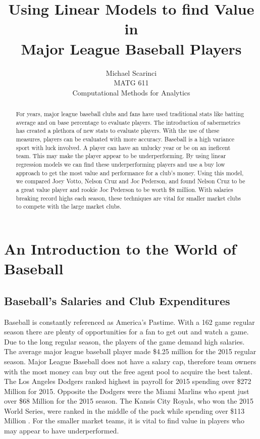 \documentclass[12pt]{article}
\title{Using Linear Models to find Value in \\Major League Baseball Players}
\author{Michael Scarinci \\MATG 611 \\Computational Methods for Analytics}
\begin{document}
\maketitle

\begin{abstract}
For years, major league baseball clubs and fans have used traditional stats like batting average and on base percentage to evaluate players. The introduction of sabermetrics has created a plethora of new stats to evaluate players. With the use of these measures, players can be evaluated with more accuracy. Baseball is a high variance sport with luck involved. A player can have an unlucky year or be on an ineficent team. This may make the player appear to be underperforming. By using linear regression models we can find these underperforming players and use a buy low approach to get the most value and performance for a club's money. Using this model, we compared Joey Votto, Nelson Cruz and Joc Pederson, and found Nelson Cruz to be a great value player and rookie Joc Pederson to be worth \$8 million. With salaries breaking record highs each season, these techniques are vital for smaller market clubs to compete with the large market clubs.
\end{abstract}

\section{An Introduction to the World of Baseball}

\subsection{Baseball's Salaries and Club Expenditures}
\qquad Baseball is constantly referenced as America's Pastime. With a 162 game regular season there are plenty of opportunities for a fan to get out and watch a game. Due to the long regular season, the players of the game demand high salaries. The average major league baseball player made \$4.25 million for the 2015 regular season. Major League Baseball does not have a salary cap, therefore team owners with the most money can buy out the free agent pool to acquire the best talent. The Los Angeles Dodgers ranked highest in payroll for 2015 spending over \$272 Million for 2015. Opposite the Dodgers were the Miami Marlins who spent just over \$68 Million for the 2015 season. The Kansis City Royals, who won the 2015 World Series, were ranked in the middle of the pack while spending over \$113 Million \cite{deadspin}. For the smaller market teams, it is vital to find value in players who may appear to have underperformed.
\end{document}
